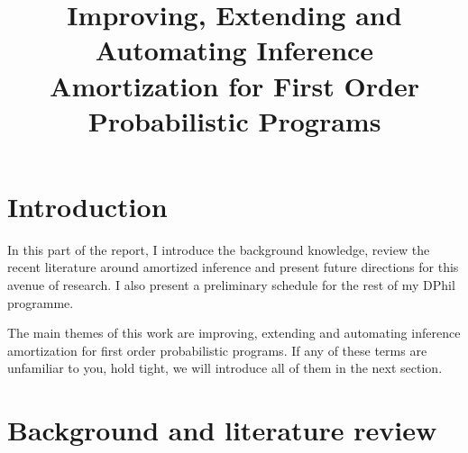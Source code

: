 \documentclass[12pt]{article}
\begin{document}




\title{Improving, Extending and Automating Inference Amortization for First Order Probabilistic Programs}
\date{}
\maketitle

\vspace{-90pt}

\section{Introduction}

In this part of the report, I introduce the background knowledge, review the recent literature around amortized inference and present future directions for this avenue of research. 
I also present a preliminary schedule for the rest of my DPhil programme.

The main themes of this work are improving, extending and automating inference amortization for first order probabilistic programs.
If any of these terms are unfamiliar to you, hold tight, we will introduce all of them in the next section.


\section{Background and literature review}
\end{document}
